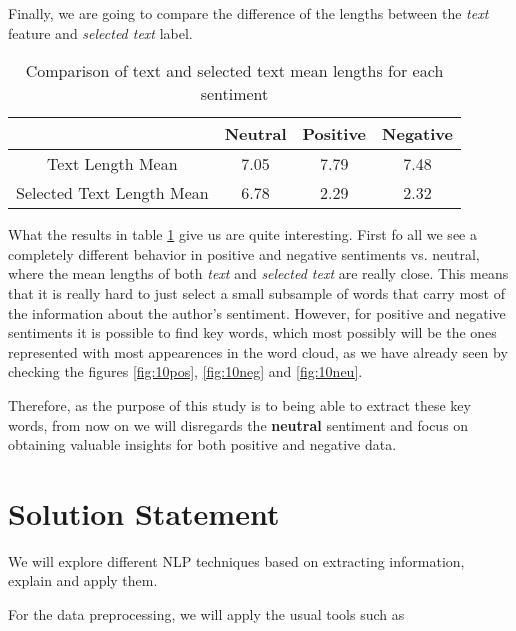 \documentclass[11pt]{article}
\begin{document}
Finally, we are going to compare the difference of the lengths between the \textit{text} feature and \textit{selected text} label.

\begin{table}[h]
\centering
\begin{tabular}{c|c|c|c}
\hline
\hline
 & Neutral & Positive & Negative \\ \hline
Text Length Mean & 7.05 & 7.79 & 7.48 \\ 
Selected Text Length Mean & 6.78 & 2.29 & 2.32 \\ 
\hline
\hline
\end{tabular}
\caption{Comparison of text and selected text mean lengths for each sentiment}
\label{tab:text-lengths}
\end{table}

What the results in table \ref{tab:text-lengths} give us are quite interesting. First fo all we see a completely different behavior in positive and negative sentiments vs. neutral, where the mean lengths of both \textit{text} and \textit{selected text} are really close. This means that it is really hard to just select a small subsample of words that carry most of the information about the author's sentiment. However, for positive and negative sentiments it is possible to find key words, which most possibly will be the ones represented with most appearences in the word cloud, as we have already seen by checking the figures \ref{fig:10pos}, \ref{fig:10neg} and \ref{fig:10neu}.

Therefore, as the purpose of this study is to being able to extract these key words, from now on we will disregards the \textbf{neutral} sentiment and focus on obtaining valuable insights for both positive and negative data.

\section{Solution Statement}

We will explore different NLP techniques based on extracting information, explain and apply them.

For the data preprocessing, we will apply the usual tools such as 
\end{document}

